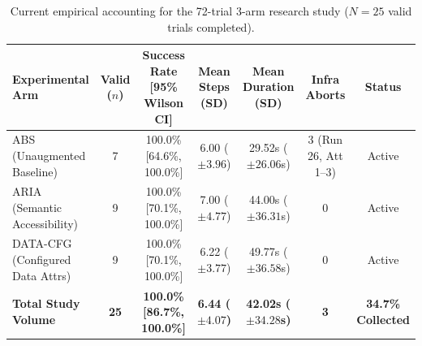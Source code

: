 \documentclass[11pt,a4paper]{article}
\begin{document}
\begin{table}[ht]
\centering
\small
\caption{Current empirical accounting for the 72-trial 3-arm research study ($N=25$ valid trials completed).}
\label{tab:results_status}
\begin{tabular}{lcccccc}
\toprule
\textbf{Experimental Arm} & \textbf{Valid ($n$)} & \textbf{Success Rate [95\% Wilson CI]} & \textbf{Mean Steps (SD)} & \textbf{Mean Duration (SD)} & \textbf{Infra Aborts} & \textbf{Status} \\
\midrule
\textsc{ABS} (Unaugmented Baseline)       & 7 & 100.0\% [64.6\%, 100.0\%] & 6.00 ($\pm 3.96$) & 29.52s ($\pm 26.06$s) & 3 (Run 26, Att 1--3) & Active \\
\textsc{ARIA} (Semantic Accessibility)     & 9 & 100.0\% [70.1\%, 100.0\%] & 7.00 ($\pm 4.77$) & 44.00s ($\pm 36.31$s) & 0                     & Active \\
\textsc{DATA-CFG} (Configured Data Attrs)  & 9 & 100.0\% [70.1\%, 100.0\%] & 6.22 ($\pm 3.77$) & 49.77s ($\pm 36.58$s) & 0                     & Active \\
\midrule
\textbf{Total Study Volume}                & \textbf{25} & \textbf{100.0\% [86.7\%, 100.0\%]} & \textbf{6.44 ($\pm 4.07$)} & \textbf{42.02s ($\pm 34.28$s)} & \textbf{3} & \textbf{34.7\% Collected} \\
\bottomrule
\end{tabular}
\end{table}
\end{document}
